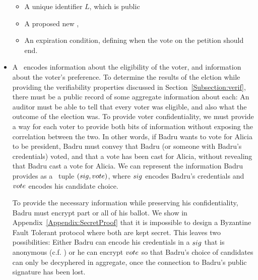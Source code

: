 \begin{itemize}
\begin{itemize}
      \item A unique identifier $L$, which is public
      \item A proposed new \KwManifest,
      \item An expiration condition, defining when the vote on the petition
        should end.
    \end{itemize}
  \item A \StructBallot~encodes information about the eligibility of the voter,
    and information about the voter's preference. To determine the results of
    the elction while providing the verifiability properties discussed in
    Section~\ref{Subsection:verif}, there must be a public record of some
    aggregate information about each: An auditor must be able to tell that every
    voter was eligible, and also what the outcome of the election was. To
    provide voter confidentiality, we must provide a way for each voter to
    provide both bits of information without exposing the correlation between
    the two. In other words, if Badru wants to vote for Alicia to be president,
    Badru must convey that Badru (or someone with Badru's credentials) voted,
    and that a vote has been cast for Alicia, without revealing that Badru cast
    a vote for Alicia. We can represent the information Badru provides as a
    \StructBallot~tuple $(sig, vote)$, where $sig$ encodes Badru's
    credentials and $vote$ encodes his candidate choice.

    To provide the necessary information while preserving his
    confidentiality, Badru must encrypt part or all of his ballot.
    We show
    in Appendix~\ref{Appendix:SecretProof} that it is impossible to design
    a Byzantine Fault Tolerant protocol where both are kept secret. This leaves
    two possibilities:
    Either Badru can encode his credentials in a $sig$ that is anonymous
    (c.f. \cite{lrs})
    or he can encrypt $vote$ so that Badru's choice of candidates can only be
    decyphered in aggregate, once the connection to Badru's public signature has
    been lost.

\end{itemize}


